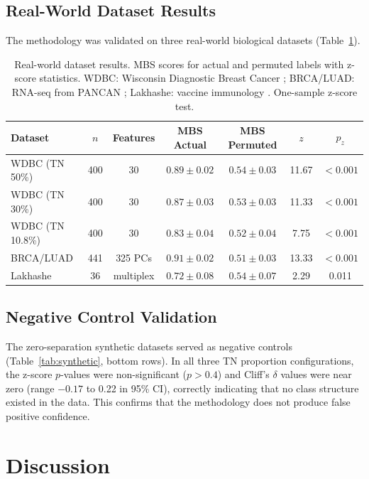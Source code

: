 \documentclass[11pt]{article}
\begin{document}
\subsection{Real-World Dataset Results}

The methodology was validated on three real-world biological datasets (Table~\ref{tab:realworld}).

\begin{table}[H]
\centering
\caption{Real-world dataset results. MBS scores for actual and permuted labels with z-score statistics. WDBC: Wisconsin Diagnostic Breast Cancer \citep{wolberg1995}; BRCA/LUAD: RNA-seq from PANCAN \citep{weinstein2013}; Lakhashe: vaccine immunology \citep{lakhashe2021}. One-sample z-score test.}
\label{tab:realworld}
\begin{tabular}{lcccccc}
\toprule
\textbf{Dataset} & \textbf{$n$} & \textbf{Features} & \textbf{MBS Actual} & \textbf{MBS Permuted} & \textbf{$z$} & \textbf{$p_z$} \\
\midrule
WDBC (TN 50\%) & 400 & 30 & $0.89 \pm 0.02$ & $0.54 \pm 0.03$ & 11.67 & $< 0.001$ \\
WDBC (TN 30\%) & 400 & 30 & $0.87 \pm 0.03$ & $0.53 \pm 0.03$ & 11.33 & $< 0.001$ \\
WDBC (TN 10.8\%) & 400 & 30 & $0.83 \pm 0.04$ & $0.52 \pm 0.04$ & 7.75 & $< 0.001$ \\
BRCA/LUAD & 441 & 325 PCs & $0.91 \pm 0.02$ & $0.51 \pm 0.03$ & 13.33 & $< 0.001$ \\
Lakhashe & 36 & multiplex & $0.72 \pm 0.08$ & $0.54 \pm 0.07$ & 2.29 & 0.011 \\
\bottomrule
\end{tabular}
\end{table}

\subsection{Negative Control Validation}

The zero-separation synthetic datasets served as negative controls (Table~\ref{tab:synthetic}, bottom rows). In all three TN proportion configurations, the z-score $p$-values were non-significant ($p > 0.4$) and Cliff's $\delta$ values were near zero (range $-0.17$ to 0.22 in 95\% CI), correctly indicating that no class structure existed in the data. This confirms that the methodology does not produce false positive confidence.

\section{Discussion}
\end{document}
